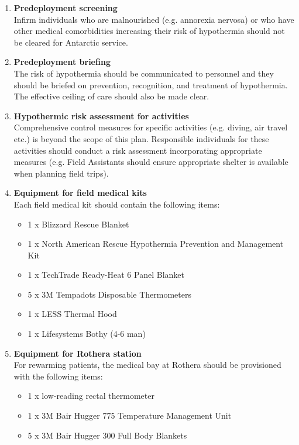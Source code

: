 \documentclass[12pt,a4paper]{article}
\newenvironment{boldenumerate}
    {\begin{enumerate}\renewcommand\labelenumi{\textbf\theenumi}}
    {\end{enumerate}}
\begin{document}
\begin{boldenumerate}
    \item \textbf{Predeployment screening} \\
    Infirm individuals who are malnourished (e.g. annorexia nervosa) or who have other medical comorbidities increasing their risk of hypothermia should not be cleared for Antarctic service.
    \item \textbf{Predeployment briefing} \\
    The risk of hypothermia should be communicated to personnel and they should be briefed on prevention, recognition, and treatment of hypothermia. The effective ceiling of care should also be made clear.
    \item \textbf{Hypothermic risk assessment for activities} \\
    Comprehensive control measures for specific activities (e.g. diving, air travel etc.) is beyond the scope of this plan. Responsible individuals for these activities should conduct a risk assessment incorporating appropriate measures (e.g. Field Assistants should ensure appropriate shelter is available when planning field trips).
    \item \textbf{Equipment for field medical kits} \\
    Each field medical kit should contain the following items:
    \begin{itemize}
        \item 1 x  Blizzard Rescue Blanket
        \item 1 x North American Rescue Hypothermia Prevention and Management Kit
        \item 1 x TechTrade Ready-Heat 6 Panel Blanket
        \item 5 x 3M Tempadots Disposable Thermometers
        \item 1 x LESS Thermal Hood
        \item 1 x Lifesystems Bothy (4-6 man)
    \end{itemize}
    \item \textbf{Equipment for Rothera station} \\
    For rewarming patients, the medical bay at Rothera should be provisioned with the following items:
    \begin{itemize}
        \item 1 x  low-reading rectal thermometer
        \item 1 x 3M Bair Hugger 775 Temperature Management Unit
        \item 5 x 3M Bair Hugger 300 Full Body Blankets

\end{itemize}
\end{boldenumerate}
\end{document}
